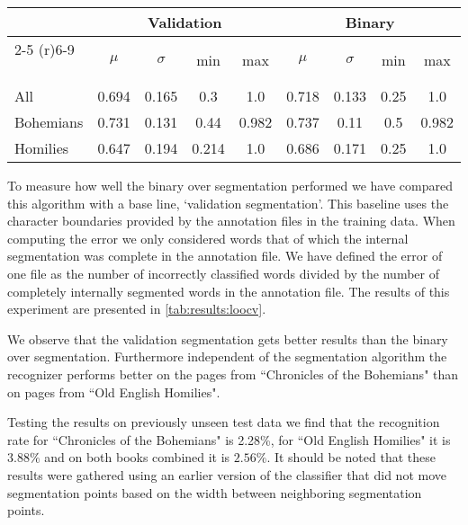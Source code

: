 
\begin{table*}[!t]
\caption{LOOCV Error}
\label{tab:results:loocv}
\centering
	\begin{tabular}{lcccccccc}
		\toprule
					& \multicolumn{4}{c}{Validation} & \multicolumn{4}{c}{Binary}\\
					\cmidrule(r){2-5} \cmidrule(r){6-9}
		~ 			& $\mu$ 	& $\sigma$ 	& min 	& max 	& $\mu$ 	& $\sigma$ 	& min 	& max \\
		\midrule
		All 		& 0.694 	& 0.165 	& 0.3 	& 1.0 	& 0.718 	& 0.133 	& 0.25 	& 1.0 \\
		Bohemians 	& 0.731 	& 0.131 	& 0.44 	& 0.982 & 0.737 	& 0.11 		& 0.5 	& 0.982 \\
		Homilies 	& 0.647 	& 0.194 	& 0.214 & 1.0 	& 0.686 	& 0.171 	& 0.25 	& 1.0 \\
		\bottomrule
	\end{tabular}
\end{table*}

To measure how well the binary over segmentation performed we have compared this algorithm with a base line, `validation segmentation'. This baseline uses the character boundaries provided by the annotation files in the training data. When computing the error we only considered words that of which the internal segmentation was complete in the annotation file. We have defined the error of one file as the number of incorrectly classified words divided by the number of completely internally segmented words in the annotation file.  The results of this experiment are presented in \cref{tab:results:loocv}. 

We observe that the validation segmentation gets better results than the binary over segmentation. Furthermore independent of the segmentation algorithm the recognizer performs better on the pages from ``Chronicles of the Bohemians" than on pages from ``Old English Homilies".

Testing the results on previously unseen test data we find that the recognition rate for ``Chronicles of the Bohemians" is 2.28\%, for ``Old English Homilies" it is $3.88\%$ and on both books combined it is $2.56\%$. It should be noted that these results were gathered using an earlier version of the classifier that did not move segmentation points based on the width between neighboring segmentation points.